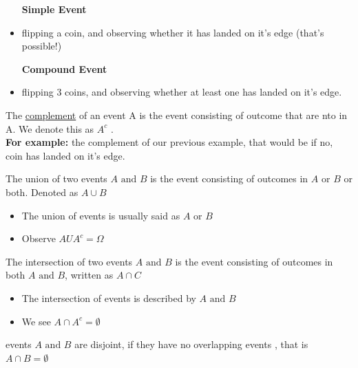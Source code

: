 \documentclass[11pt]{book}
\begin{document}
    \begin{itemize}
        \item [\textbf{Simple Event}] 
        \item flipping a coin, and observing whether it has landed on it's edge (that's possible!)
        \item [\textbf{Compound Event}] 
        \item flipping 3 coins, and observing whether at least one has landed on it's edge. 
    \end{itemize}

\begin{defn}[Complement]\label{defn:complement}
    The \underline{complement} of an event A is the event consisting of outcome that are nto in A. We denote this as $A^{c} $ .\\
    \textbf{For example:} the complement of our previous example, that would be if no, coin has landed on it's edge.
\end{defn}

\begin{defn}[Union]\label{defn:union}
    The union of two events $A \text{ and } B$ is the event consisting of outcomes in $A $  or $B$ or both. Denoted as $A\cup B$ 
    \begin{itemize}
        \item The union of events is usually said as $A$ or $B$ 
        \item Observe $AUA^{c} = \Omega $  
    \end{itemize}
\end{defn}

\begin{defn}[Intersection]\label{defn:intersection}
    The intersection of two events $A \text{ and } B$ is the event consisting of outcomes in both $A \text{ and } B$, written as $A\cap C$ 
    \begin{itemize}
        \item The intersection of events is described by $A \text{ and } B$ 
        \item We see $A\cap A^{c} = \emptyset $ 
    \end{itemize}
\end{defn}

\begin{defn}[Disjoint]\label{defn:disjoint}
    events $A \text{ and } B$ are disjoint, if they have no overlapping events , that is $A\cap B= \emptyset $ 
\end{defn}
\end{document}
